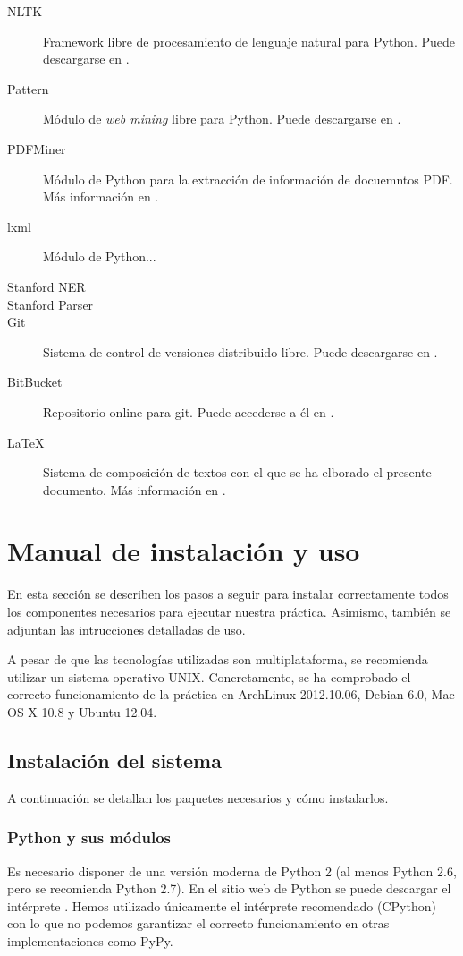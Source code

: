 \documentclass[12pt,a4paper,titlepage]{article}
\begin{document}
\begin{description}
	\item[NLTK] Framework libre de procesamiento de lenguaje natural para Python. Puede descargarse en \cite{nltk}.
	\item[Pattern] Módulo de \emph{web mining} libre para Python. Puede descargarse en \cite{pattern}.
	\item[PDFMiner] Módulo de Python para la extracción de información de docuemntos PDF. Más información en \cite{pdfminer}.
	\item[lxml] Módulo de Python...
	\item[Stanford NER]
	\item[Stanford Parser]
	\item[Git] Sistema de control de versiones distribuido libre. Puede descargarse en \cite{git}.
	\item[BitBucket] Repositorio online para git. Puede accederse a él en \cite{bitbucket}.
	\item[\LaTeX] Sistema de composición de textos con el que se ha elborado el presente documento. Más información en \cite{latex}.

\end{description}


\clearpage
\section{Manual de instalación y uso}
En esta sección se describen los pasos a seguir para instalar correctamente todos los componentes necesarios para ejecutar nuestra práctica. Asimismo, también se adjuntan las intrucciones detalladas de uso.

A pesar de que las tecnologías utilizadas son multiplataforma, se recomienda utilizar un sistema operativo UNIX. Concretamente, se ha comprobado el correcto funcionamiento de la práctica en ArchLinux 2012.10.06, Debian 6.0, Mac OS X 10.8 y Ubuntu 12.04.

\subsection{Instalación del sistema}
A continuación se detallan los paquetes necesarios y cómo instalarlos.

\subsubsection{Python y sus módulos}
Es necesario disponer de una versión moderna de Python 2 (al menos Python 2.6, pero se recomienda Python 2.7). En el sitio web de Python se puede descargar el intérprete \cite{python}. Hemos utilizado únicamente el intérprete recomendado (CPython) con lo que no podemos garantizar el correcto funcionamiento en otras implementaciones como PyPy.
\end{document}
